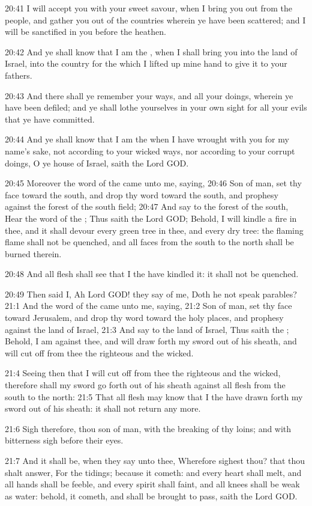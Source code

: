 20:41 I will accept you with your sweet savour, when I bring you out from the people, and gather you out of the countries wherein ye have been scattered; and I will be sanctified in you before the heathen.

20:42 And ye shall know that I am the \LORD, when I shall bring you into the land of Israel, into the country for the which I lifted up mine hand to give it to your fathers.

20:43 And there shall ye remember your ways, and all your doings, wherein ye have been defiled; and ye shall lothe yourselves in your own sight for all your evils that ye have committed.

20:44 And ye shall know that I am the \LORD when I have wrought with you for my name's sake, not according to your wicked ways, nor according to your corrupt doings, O ye house of Israel, saith the Lord GOD.

20:45 Moreover the word of the \LORD came unto me, saying, 20:46 Son of man, set thy face toward the south, and drop thy word toward the south, and prophesy against the forest of the south field; 20:47 And say to the forest of the south, Hear the word of the \LORD; Thus saith the Lord GOD; Behold, I will kindle a fire in thee, and it shall devour every green tree in thee, and every dry tree: the flaming flame shall not be quenched, and all faces from the south to the north shall be burned therein.

20:48 And all flesh shall see that I the \LORD have kindled it: it shall not be quenched.

20:49 Then said I, Ah Lord GOD! they say of me, Doth he not speak parables?  21:1 And the word of the \LORD came unto me, saying, 21:2 Son of man, set thy face toward Jerusalem, and drop thy word toward the holy places, and prophesy against the land of Israel, 21:3 And say to the land of Israel, Thus saith the \LORD; Behold, I am against thee, and will draw forth my sword out of his sheath, and will cut off from thee the righteous and the wicked.

21:4 Seeing then that I will cut off from thee the righteous and the wicked, therefore shall my sword go forth out of his sheath against all flesh from the south to the north: 21:5 That all flesh may know that I the \LORD have drawn forth my sword out of his sheath: it shall not return any more.

21:6 Sigh therefore, thou son of man, with the breaking of thy loins; and with bitterness sigh before their eyes.

21:7 And it shall be, when they say unto thee, Wherefore sighest thou?  that thou shalt answer, For the tidings; because it cometh: and every heart shall melt, and all hands shall be feeble, and every spirit shall faint, and all knees shall be weak as water: behold, it cometh, and shall be brought to pass, saith the Lord GOD.

